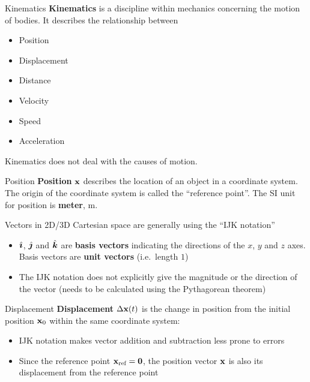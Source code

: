 \documentclass[12pt,compress,aspectratio=169]{beamer}
\newcommand{\iii}{\ensuremath\hat{\bm{\imath}}}
\newcommand{\jjj}{\ensuremath\hat{\bm{\jmath}}}
\newcommand{\kkk}{\ensuremath\hat{\bm{k}}}
\newcommand{\mb}[1]{\ensuremath\mathbf{#1}}
\newcommand{\eq}[2]{\vspace{#1}{\Large\begin{displaymath}#2\end{displaymath}}}
\begin{document}
\begin{frame}{Kinematics}
  \textbf{Kinematics} is a discipline within mechanics concerning the
  motion of bodies. It describes the relationship between 
  \begin{itemize}
  \item<alert@1> Position
  \item<alert@1> Displacement
  \item Distance 
  \item<alert@1> Velocity
  \item Speed
  \item<alert@1> Acceleration
  \end{itemize}
  Kinematics does not deal with the causes of motion.
\end{frame}



\begin{frame}{Position}
  \textbf{Position} $\mb{x}$ describes the location of an object in a
  coordinate system.%
  The origin of the coordinate system is called the ``reference point''.
  The SI unit for position is \textbf{meter}, \si{\metre}.
  
  \eq{-.2in}{
    \mb{x}(t)=x(t)\iii + y(t)\jjj + z(t)\kkk
  }

  Vectors in 2D/3D Cartesian space are generally using the ``IJK notation''
  \begin{itemize}
  \item $\iii$, $\jjj$ and $\kkk$ are \textbf{basis vectors} indicating the
    directions of the $x$, $y$ and $z$ axes. Basis vectors are
    \textbf{unit vectors} (i.e.\ length $1$)
  \item The IJK notation does not explicitly give the magnitude or the direction
    of the vector (needs to be calculated using the Pythagorean theorem)
  \end{itemize}
\end{frame}



\begin{frame}{Displacement}
  \textbf{Displacement} $\Delta\mb{x}(t)$ is the change in position from the
  initial position $\mb{x}_0$ within the same coordinate system:

  \eq{-.25in}{
      \Delta\mb{x}(t)=\mb{x}-\mb{x}_0
      =(x-x_0)\iii + (y-y_0)\jjj + (z-z_0)\kkk
  }
  \begin{itemize}
  \item IJK notation makes vector addition and subtraction less prone to errors
  \item Since the reference point $\mb{x}_{\textrm{ref}}=\mb{0}$, the position
    vector $\mb{x}$ is also its displacement from the reference point
  \end{itemize}
\end{frame}
\end{document}

